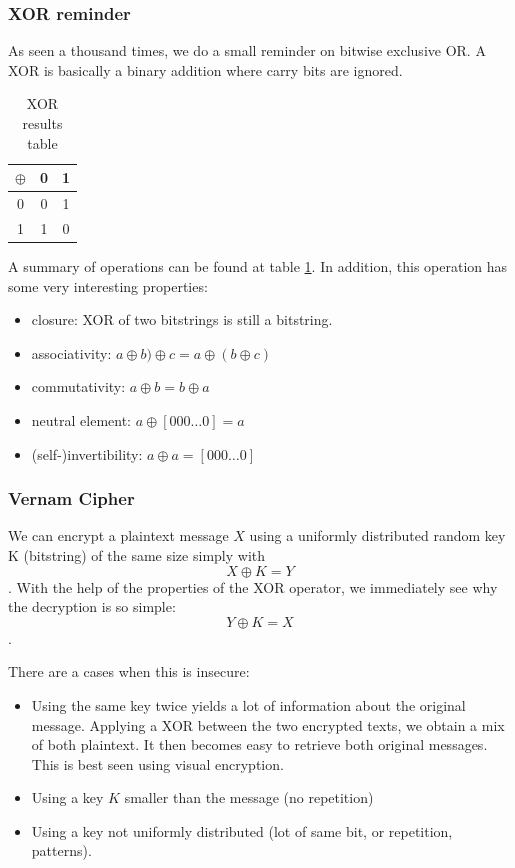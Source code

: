 \documentclass[11pt,a4paper]{article}
\begin{document}
\subsubsection{XOR reminder}
As seen a thousand times, we do a small reminder on bitwise exclusive OR. A XOR is basically a binary addition where carry bits are ignored.
\begin{table}
    \begin{tabular}{|c||c|c|}
        \hline
        $\oplus$ & 0 & 1\\
        \hline
        \hline
        0 & 0 & 1\\
        \hline
        1 & 1 & 0\\
        \hline
    \end{tabular}
    \caption{XOR results table}
    \label{tab:xor}
\end{table}
A summary of operations can be found at table \ref{tab:xor}. In addition, this operation has some very interesting properties:
\begin{itemize}
    \item closure: XOR of two bitstrings is still a bitstring.
    \item associativity: $a \oplus b) \oplus c = a \oplus (b \oplus c)$
    \item commutativity: $a \oplus b = b \oplus a$
    \item neutral element: $a \oplus [000\ldots0] = a$
    \item (self-)invertibility: $a \oplus a = [000\ldots0]$
\end{itemize}

\subsubsection{Vernam Cipher}
We can encrypt a plaintext message $X$ using a uniformly distributed random key K (bitstring) of the same size simply with \[X \oplus K = Y\]. With the help of the properties of the XOR operator, we immediately see why the decryption is so simple: \[Y \oplus K = X\].

There are a cases when this is insecure:
\begin{itemize}
    \item Using the same key twice yields a lot of information about the original message. Applying a XOR between the two encrypted texts, we obtain a mix of both plaintext. It then becomes easy to retrieve both original messages. This is best seen using visual encryption.
    \item Using a key $K$ smaller than the message (no repetition)
    \item Using a key not uniformly distributed (lot of same bit, or repetition, patterns).
\end{itemize}
\end{document}
